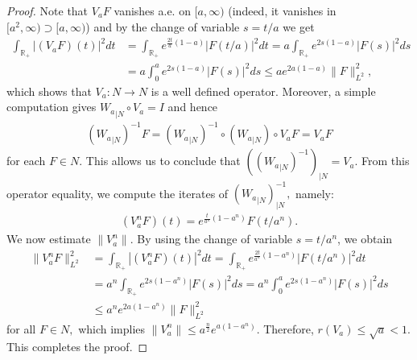 \documentclass[10pt,a4paper]{amsart}
\begin{document}
\begin{proof}

Note that $V_aF$ vanishes a.e. on $[a,\infty)$ (indeed, it vanishes in $[a^2, \infty) \supset [a, \infty)$) and  by the change of variable $s=t/a$ we get  
\begin{align*}
\int_{\mathbb{R}_+}|(V_aF)(t)|^2dt&=\int_{\mathbb{R}_+}e^{\frac{2t}{a}(1-a)}|F(t/a)|^2dt=a\int_{\mathbb{R}_+}e^{2s(1 - a)}|F(s)|^2ds\\
&= a\int_{0}^{a} e^{2s(1-a)}|F(s)|^2ds\leq ae^{2a(1-a)}\|F\|^2_{L^2},
\end{align*}
which shows that $V_a: N \to N$ is a well defined operator. Moreover, a simple computation gives ${W_a}_{|N} \circ V_a=I$  and hence 
\begin{align*}
({W_a}_{|N})^{-1}F=({W_a}_{|N})^{-1}\circ({W_a}_{|N}) \circ V_aF = V_aF
\end{align*}
for each $F\in N.$ This allows us to conclude that $\left( ({W_a}_{|N})^{-1} \right)_{|N}=V_a.$ From this operator equality, we compute the iterates of $({W_a}_{|N})^{-1}_{|N},$ namely:
\begin{align*}
(V_a^nF)(t)=e^{\frac{t}{a^n}(1-a^n)}F(t/a^n).
\end{align*}
We now estimate $\|V_a^n\|.$ By using the change of variable $s=t/a^n$, we obtain
\begin{align*}
\|V_a^nF\|^2_{L^2}&=\int_{\mathbb{R}_+}|(V_a^nF)(t)|^2dt=\int_{\mathbb{R}_+}e^{\frac{2t}{a^n}(1-a^n)}|F(t/a^n)|^2dt\\
&=a^n\int_{\mathbb{R}_+}e^{2s(1-a^n)}|F(s)|^2ds=a^n\int_{0}^ae^{2s(1-a^n)}|F(s)|^2ds\\
&\leq a^ne^{2a(1-a^n)}\|F\|^2_{L^2}
\end{align*}
for all $F\in N,$ which implies $\|V_a^n\|\leq a^{\frac{n}{2}}e^{a(1-a^n)}.$ Therefore, $r(V_a) \leq \sqrt{a}<1.$ This completes the proof.
\end{proof}
\end{document}
